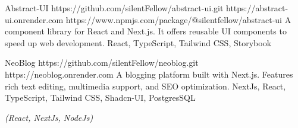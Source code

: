 \documentclass[10pt,a4paper,ragged2e,withhyper]{altacv}
\begin{document}
\begin{paracol}{2}
\divider

\cvproject
  {Abstract-UI}
  {https://github.com/silentFellow/abstract-ui.git}
  {https://abstract-ui.onrender.com}
  {https://www.npmjs.com/package/@silentfellow/abstract-ui}
  {A component library for React and Next.js. It offers reusable UI components to speed up web development.}
  {React, TypeScript, Tailwind CSS, Storybook}

\divider

\cvproject
  {NeoBlog}
  {https://github.com/silentFellow/neoblog.git}
  {https://neoblog.onrender.com}
  {}
  {A blogging platform built with Next.js. Features rich text editing, multimedia support, and SEO optimization.}
  {NextJs, React, TypeScript, Tailwind CSS, Shadcn-UI, PostgresSQL}

\medskip



\switchcolumn


{\LaTeXraggedright
{}
\par}


\divider

\textit{(React, NextJs, NodeJs)}
\divider

\divider

\divider


{\LaTeXraggedright
{}
\par}

\medskip



\divider



\end{paracol}
\end{document}

